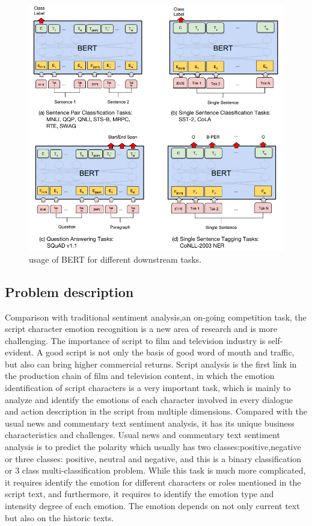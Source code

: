 \documentclass[12pt,twocolumn,letterpaper]{article}
\begin{document}
\begin{figure}
\begin{center}
\includegraphics[scale=0.9]{bert_all.png}
\end{center}
   \caption{usage of BERT for different downstream tasks.}
\label{fig:short}
\end{figure}


\subsection{Problem description}
Comparison with traditional sentiment analysis,an on-going competition task, the script character emotion recognition is a new area of research and is more challenging. The importance of script to film and television industry is self-evident. A good script is not only the basis of good word of mouth and traffic, but also can bring higher commercial returns. Script analysis is the first link in the production chain of film and television content, in which the emotion identification of script characters is a very important task, which is mainly to analyze and identify the emotions of each character involved in every dialogue and action description in the script from multiple dimensions. Compared with the usual news and commentary text sentiment analysis, it has its unique business characteristics and challenges. Usual news and commentary text sentiment analysis is to predict the polarity which usually has two classes:positive,negative or three classes: positive, neutral and negative, and this is a binary classification or 3 class multi-classification problem. While this task is much more complicated, it requires identify the emotion for different characters or roles mentioned in the script text, and furthermore, it requires to identify the emotion type and intensity degree of each emotion. The emotion depends on not only current text but also on the historic texts.
\end{document}
